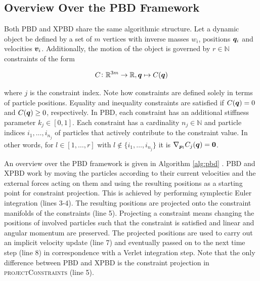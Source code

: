 \subsection{Overview Over the PBD Framework}\label{ss:pbd-framework}
Both PBD and XPBD share the same algorithmic structure. Let a dynamic object be defined by a set of $m$ 
vertices with inverse masses $w_i$, positions $\bm{q}_i$ and velocities $\bm{v}_i$. Additionally, the motion of the object is governed by 
$r \in \mathbb{N}$ constraints of the form 

\[
C \colon \mathbb{R}^{3m} \to \mathbb{R}, \bm{q} \mapsto C(\bm{q})
\]

\noindent where $j$ is the constraint index. Note how constraints are defined solely in terms of particle positions. Equality and inequality constraints 
are satisfied if $C(\bm{q}) = 0$ and $C(\bm{q}) \geq 0$, respectively. In PBD, each constraint has an additional stiffness parameter $k_j \in [0,1]$. 
Each constraint has a cardinality $n_j \in \mathbb{N}$ and particle indices $i_1, \ldots, i_{n_j}$ of particles that actively contribute to the 
constraint value. In other words, for $l \in [1, \ldots, r]$ with $l \notin \{i_1, \ldots, i_{n_j}\}$ it is $\nabla_{\bm{p}_l}C_j(\bm{q}) = \bm{0}$.

An overview over the PBD framework is given in Algorithm \ref{alg:pbd} \cite{mueller2006}. PBD and XPBD work by moving the particles according to their current 
velocities and the external forces acting on them and using the resulting positions as a starting point for constraint projection. This is achieved by 
performing symplectic Euler integration (lines 3-4). The resulting positions 
are projected onto the constraint manifolds of the constraints (line 5). Projecting a constraint means changing the positions of involved particles 
such that the constraint is satisfied and linear and angular momentum are preserved. The projected positions are used to carry out an implicit 
velocity update (line 7) and eventually passed on to the next time step (line 8) in correspondence with a Verlet integration step. Note that the only
difference between PBD and XPBD is the constraint projection in \textsc{projectConstraints} (line 5).

